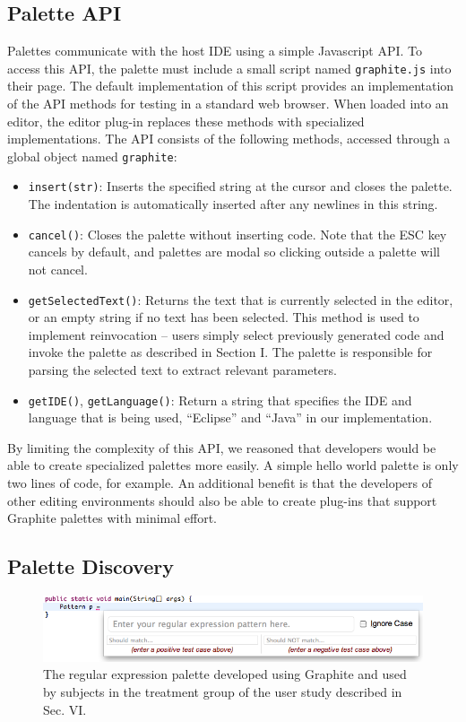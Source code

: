 \documentclass[10pt, conference, compsocconf]{IEEEtran}
\begin{document}
\subsection{Palette API}
Palettes communicate with the host IDE using a simple Javascript API. To access this API, the palette must include a small script named \verb|graphite.js| into their page. The default implementation of this script provides an implementation of the API methods for testing in a standard web browser. When loaded into an editor, the editor plug-in replaces these methods with specialized implementations. The API consists of the following methods, accessed through a global object named \verb|graphite|:
\begin{itemize}
	\item \verb|insert(str)|: Inserts the specified string at the cursor and closes the palette. The indentation is automatically inserted after any newlines in this string.
	
	\item \verb|cancel()|: Closes the palette without inserting code. Note that the ESC key cancels by default, and palettes are modal so clicking outside a palette will not cancel.
	
	\item \verb|getSelectedText()|: Returns the text that is currently selected in the editor, or an empty string if no text has been selected. This method is used to implement reinvocation -- users simply select previously generated code and invoke the palette as described in Section I. The palette is responsible for parsing the selected text to extract relevant parameters.
	
	\item \verb|getIDE()|, \verb|getLanguage()|: Return a string that specifies the IDE and language that is being used, ``Eclipse'' and ``Java'' in our implementation.
\end{itemize}

By limiting the complexity of this API, we reasoned that developers would be able to create specialized palettes more easily. A simple hello world palette is only two lines of code, for example. An additional benefit is that the developers of other editing environments should also be able to create plug-ins that support Graphite palettes with minimal effort.

\subsection{Palette Discovery}
\begin{figure}\begin{center}
\vspace{2mm}
\includegraphics[scale=.6]{regex.png}\end{center}
\caption{The regular expression palette developed using Graphite and used by subjects in the treatment group of the user study described in Sec. VI.}
\end{figure}
\end{document}
